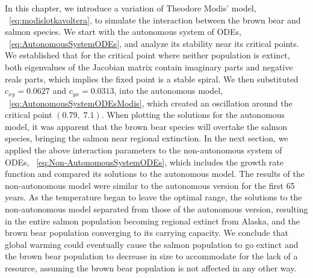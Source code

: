 In this chapter, we introduce a variation of Theodore Modis' model, \equationautorefname~\eqref{eq:modislotkavoltera}, to simulate the interaction between the brown bear and salmon species. 
We start with the autonomous system of ODEs, \equationautorefname~\eqref{eq:AutonomousSystemODEs}, and analyze its stability near its critical points.
We established that for the critical point where neither population is extinct, both eigenvalues of the Jacobian matrix contain imaginary parts and negative reals parts, which implies the fixed point is a stable spiral.
We then substituted $c_{xy}=0.0627$ and $c_{yx}=0.0313$, into the autonomous model, \equationautorefname~\eqref{eq:AutonomousSystemODEsModis}, which created an oscillation around the critical point $(0.79,\;7.1)$.
When plotting the solutions for the autonomous model, it was apparent that the brown bear species will overtake the salmon species, bringing the salmon near regional extinction.
In the next section, we applied the above interaction parameters to the non-autonomous system of ODEs, \equationautorefname~\eqref{eq:Non-AutonomousSystemODEs}, which includes the growth rate function and compared its solutions to the autonomous model.
The results of the non-autonomous model were similar to the autonomous version for the first 65 years. As the temperature began to leave the optimal range, the solutions to the non-autonomous model separated from those of the autonomous version, resulting in the entire salmon population becoming regional extinct from Alaska, and the brown bear population converging to its carrying capacity.
We conclude that global warming could eventually cause the salmon population to go extinct and the brown bear population to decrease in size to accommodate for the lack of a resource, assuming the brown bear population is not affected in any other way.